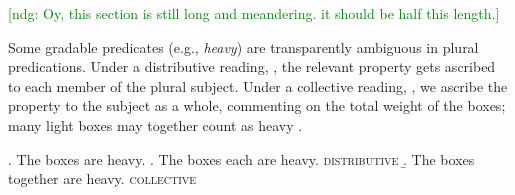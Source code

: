 \documentclass[linguex]{sp}
\newcommand{\ndg}[1]{\textcolor{Green}{[ndg: #1]}}
\begin{document}
%

\ndg{Oy, this section is still long and meandering. it should be half this length.}

Some gradable predicates (e.g., \emph{heavy}) are transparently ambiguous in plural predications. Under a distributive reading, \Next[a], the relevant property gets ascribed to each member of the plural subject. Under a collective reading, \Next[b], we ascribe the property to the subject as a whole, commenting on the total weight of the boxes; many light boxes may together count as heavy \citep{scha1984}.

\ex. The boxes are heavy.
\a. The boxes each are heavy. \hfill \textsc{distributive}
\b. The boxes together are heavy. \hfill \textsc{collective}

\end{document}
